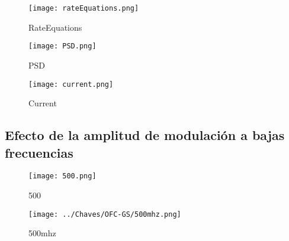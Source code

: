 				\begin{figure}[H]
					\centering
					\texttt{[image: rateEquations.png]}
					\caption{\label{Img:rateEquations}RateEquations}	
				\end{figure}

				\begin{figure}[H]
					\centering
					\texttt{[image: PSD.png]}
					\caption{\label{Img:PSD}PSD}	
				\end{figure}

				\begin{figure}[H]
					\centering
					\texttt{[image: current.png]}
					\caption{\label{Img:current}Current}	
				\end{figure}

		\subsection{Efecto de la amplitud de modulación a bajas frecuencias}

				\begin{figure}[H]
					\centering
					\texttt{[image: 500.png]}
					\caption{\label{Img:500}500}	
				\end{figure}

				\begin{figure}[H]
					\centering
					\texttt{[image: ../Chaves/OFC-GS/500mhz.png]}
					\caption{\label{Img:500mhz}500mhz}	
				\end{figure}
